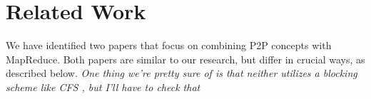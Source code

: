 \documentclass[10pt, conference, compsocconf]{IEEEtran}
\begin{document}
\section{Related Work}

We have identified two papers that focus on combining P2P concepts with MapReduce.  Both papers are similar to our research, but differ in crucial ways, as described below.
\textit{One thing we're pretty sure of is that neither utilizes a blocking scheme like CFS \cite{CFS}, but I'll have to check that}






\end{document}
